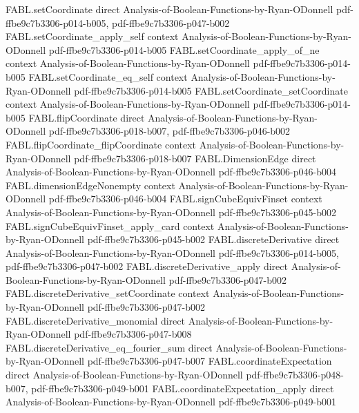 \begin{theorem}
\proofstep
  {FABL.setCoordinate}
  {direct}
  {Analysis-of-Boolean-Functions-by-Ryan-ODonnell}
  {pdf-ffbe9c7b3306-p014-b005,
    pdf-ffbe9c7b3306-p047-b002}
\proofstep
  {FABL.setCoordinate_apply_self}
  {context}
  {Analysis-of-Boolean-Functions-by-Ryan-ODonnell}
  {pdf-ffbe9c7b3306-p014-b005}
\proofstep
  {FABL.setCoordinate_apply_of_ne}
  {context}
  {Analysis-of-Boolean-Functions-by-Ryan-ODonnell}
  {pdf-ffbe9c7b3306-p014-b005}
\proofstep
  {FABL.setCoordinate_eq_self}
  {context}
  {Analysis-of-Boolean-Functions-by-Ryan-ODonnell}
  {pdf-ffbe9c7b3306-p014-b005}
\proofstep
  {FABL.setCoordinate_setCoordinate}
  {context}
  {Analysis-of-Boolean-Functions-by-Ryan-ODonnell}
  {pdf-ffbe9c7b3306-p014-b005}
\proofstep
  {FABL.flipCoordinate}
  {direct}
  {Analysis-of-Boolean-Functions-by-Ryan-ODonnell}
  {pdf-ffbe9c7b3306-p018-b007,
    pdf-ffbe9c7b3306-p046-b002}
\proofstep
  {FABL.flipCoordinate_flipCoordinate}
  {context}
  {Analysis-of-Boolean-Functions-by-Ryan-ODonnell}
  {pdf-ffbe9c7b3306-p018-b007}
\proofstep
  {FABL.DimensionEdge}
  {direct}
  {Analysis-of-Boolean-Functions-by-Ryan-ODonnell}
  {pdf-ffbe9c7b3306-p046-b004}
\proofstep
  {FABL.dimensionEdgeNonempty}
  {context}
  {Analysis-of-Boolean-Functions-by-Ryan-ODonnell}
  {pdf-ffbe9c7b3306-p046-b004}
\proofstep
  {FABL.signCubeEquivFinset}
  {context}
  {Analysis-of-Boolean-Functions-by-Ryan-ODonnell}
  {pdf-ffbe9c7b3306-p045-b002}
\proofstep
  {FABL.signCubeEquivFinset_apply_card}
  {context}
  {Analysis-of-Boolean-Functions-by-Ryan-ODonnell}
  {pdf-ffbe9c7b3306-p045-b002}
\proofstep
  {FABL.discreteDerivative}
  {direct}
  {Analysis-of-Boolean-Functions-by-Ryan-ODonnell}
  {pdf-ffbe9c7b3306-p014-b005,
    pdf-ffbe9c7b3306-p047-b002}
\proofstep
  {FABL.discreteDerivative_apply}
  {direct}
  {Analysis-of-Boolean-Functions-by-Ryan-ODonnell}
  {pdf-ffbe9c7b3306-p047-b002}
\proofstep
  {FABL.discreteDerivative_setCoordinate}
  {context}
  {Analysis-of-Boolean-Functions-by-Ryan-ODonnell}
  {pdf-ffbe9c7b3306-p047-b002}
\proofstep
  {FABL.discreteDerivative_monomial}
  {direct}
  {Analysis-of-Boolean-Functions-by-Ryan-ODonnell}
  {pdf-ffbe9c7b3306-p047-b008}
\proofstep
  {FABL.discreteDerivative_eq_fourier_sum}
  {direct}
  {Analysis-of-Boolean-Functions-by-Ryan-ODonnell}
  {pdf-ffbe9c7b3306-p047-b007}
\proofstep
  {FABL.coordinateExpectation}
  {direct}
  {Analysis-of-Boolean-Functions-by-Ryan-ODonnell}
  {pdf-ffbe9c7b3306-p048-b007,
    pdf-ffbe9c7b3306-p049-b001}
\proofstep
  {FABL.coordinateExpectation_apply}
  {direct}
  {Analysis-of-Boolean-Functions-by-Ryan-ODonnell}
  {pdf-ffbe9c7b3306-p049-b001}

\end{theorem}
